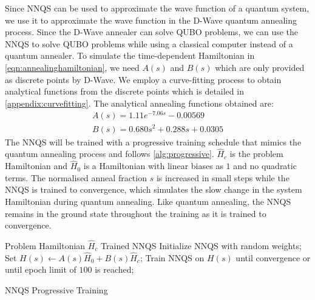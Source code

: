 Since NNQS can be used to approximate the wave function of a quantum system, we use it to approximate the wave function in the D-Wave quantum annealing process. Since the D-Wave annealer can solve QUBO problems, we can use the NNQS to solve QUBO problems while using a classical computer instead of a quantum annealer. To simulate the time-dependent Hamiltonian in \autoref{eqn:annealinghamiltonian}, we need $A(s)$ and $B(s)$ which are only provided as discrete points by D-Wave. We employ a curve-fitting process to obtain analytical functions from the discrete points which is detailed in \autoref{appendix:curvefitting}. The analytical annealing functions obtained are:
\begin{gather}
    A(s) = 1.11e^{-7.06s} -0.00569 \\
    B(s)= 0.680s^2 + 0.288s + 0.0305
    \label{fittedeq}
\end{gather}
The NNQS will be trained with a progressive training schedule that mimics the quantum annealing process and follows \autoref{alg:progressive}. $\hat{H}_c$ is the problem Hamiltonian and $\hat{H}_0$ is a Hamiltonian with linear biases as $1$ and no quadratic terms. The normalised anneal fraction $s$ is increased in small steps while the NNQS is trained to convergence, which simulates the slow change in the system Hamiltonian during quantum annealing. Like quantum annealing, the NNQS remains in the ground state throughout the training as it is trained to convergence.

\begin{algorithm}
    \begin{algorithmic}
    \Require Problem Hamiltonian $\hat{H}_c$
    \Ensure Trained NNQS
    \State Initialize NNQS with random weights;
    \State Set $H(s) \leftarrow A(s)\hat{H}_0 + B(s)\hat{H}_c$;
    \State Train NNQS on $H(s)$ until convergence or until epoch limit of $100$ is reached;
    \EndFor
    \end{algorithmic}
    \caption{NNQS Progressive Training}
    \label{alg:progressive}
\end{algorithm}

